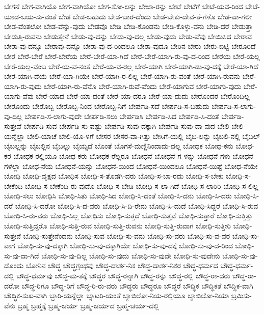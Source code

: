 {ಬೇಗನೆ
ಬೇಗ-ವಾಗಿಯೊ
ಬೇಗ-ವಾಗಿಯೋ
ಬೇಗ-ಸೋ-ಲನ್ನು
ಬೇಜಾ-ರನ್ನು
ಬೇಟೆ
ಬೇಟೆಗೆ
ಬೇಟೆ-ಯವ-ರಿಂದ
ಬೇಟೆ-ಯಾಡ-ಬಯ-ಸು-ವಂತೆ
ಬೇಡ
ಬೇಡ-ಬಹುದು
ಬೇಡ-ಬಾರ-ದೆಂದು
ಬೇಡ-ಬೇಕು-ದೇವ-ತೆ-ಗಳೊ
ಬೇಡ-ವಾ-ಗಲೀ
ಬೇಡ-ವೆಂತಲೋ
ಬೇಡ-ವೆನ್ನು-ವುದು
ಬೇಡವೊ
ಬೇಡಿ
ಬೇಡಿ-ಕೊಂಡನು
ಬೇಡಿ-ಕೊಳ್ಳು-ವನು
ಬೇಡಿ-ದರೆ
ಬೇಡುತ್ತಾ
ಬೇಡುತ್ತಿ-ರುವನು
ಬೇಡುತ್ತೇನೆ
ಬೇಡು-ವು-ದನ್ನು
ಬೇಡು-ವು-ದಲ್ಲ
ಬೇಡು-ವುದು
ಬೇಡು-ವೆವು
ಬೇಯಿಸಿದ
ಬೇರಾವ
ಬೇರಾ-ವು-ದನ್ನೂ
ಬೇರಾವು-ದನ್ನೊ
ಬೇರಾ-ವು-ದ-ರಿಂದಲೂ
ಬೇರಾ-ವುದೂ
ಬೇರಿನ
ಬೇರು
ಬೇರು-ಬಿಟ್ಟಿ
ಬೇರೂರಿದೆ
ಬೇರೆ
ಬೇರೆ-ಬೇರೆ
ಬೇರೆ-ಬೇರೆಯ
ಬೇರೆ-ಬೇರೆ-ಯಾ-ಗಿದೆ
ಬೇರೆ-ಬೇರೆ-ಯಾಗಿ-ರು-ವು-ದ-ರಿಂದ
ಬೇರೆಯ
ಬೇರೆ-ಯಲ್ಲ
ಬೇರೆ-ಯಲ್ಲ-ವೆಂಬ
ಬೇರೆ-ಯ-ವ-ನಂತೆ
ಬೇರೆ-ಯ-ವ-ರಲ್ಲ
ಬೇರೆ-ಯಾಗಿ
ಬೇರೆ-ಯಾಗಿ-ಡು-ವು-ದಕ್ಕೆ
ಬೇರೆ-ಯಾ-ಗಿದೆ
ಬೇರೆ-ಯಾಗಿ-ದೆಯೆ
ಬೇರೆ-ಯಾ-ಗಿಯೇ
ಬೇರೆ-ಯಾಗಿ-ರ-ಲಿಲ್ಲ
ಬೇರೆ-ಯಾಗಿ-ರು-ವಂತೆ
ಬೇರೆ-ಯಾಗಿ-ರುವನು
ಬೇರೆ-ಯಾಗಿ-ರು-ವುದು
ಬೇರೆ-ಯಾಗಿ-ರು-ವೆನೊ
ಬೇರೆ-ಯಾಗಿ-ರುವೆ-ವೆಂದು
ಬೇರೆ-ಯಾಗುವ
ಬೇರೆ-ಯಾಗು-ವುದು
ಬೇರೆ-ಯಾಗು-ವೆವು
ಬೇರೆ-ಯಾದ
ಬೇರೆ-ಯಾ-ದಂತೆ
ಬೇರೆ-ಯಾ-ದರೂ
ಬೇರೆ-ಯಾ-ದುದು
ಬೇರೊಂದರ
ಬೇರೊಂದಿಲ್ಲ
ಬೇರೊಂದು
ಬೇರೊಬ್ಬ
ಬೇರೊಬ್ಬ-ನಿಂದ
ಬೇರೊಬ್ಬ-ನಿಗೆ
ಬೇರ್ಪಡಿ-ಸದೆ
ಬೇರ್ಪಡಿ-ಸ-ಬಹುದು
ಬೇರ್ಪಡಿ-ಸ-ಲಾಗು-ವು-ದಿಲ್ಲ
ಬೇರ್ಪಡಿ-ಸ-ಲಾಗು-ವುದೇ
ಬೇರ್ಪಡಿ-ಸಲು
ಬೇರ್ಪಡಿಸಿ
ಬೇರ್ಪಡಿ-ಸಿದ
ಬೇರ್ಪಡಿ-ಸಿ-ದಂತೆ
ಬೇರ್ಪಡಿ-ಸುತ್ತೇವೆ
ಬೇರ್ಪಡಿ-ಸುವ
ಬೇರ್ಪಡಿ-ಸು-ವಷ್ಟು
ಬೇರ್ಪಡಿ-ಸುವು-ದಕ್ಕಾಗಿ
ಬೇರ್ಪಡಿ-ಸುವು-ದಾ-ವುದ
ಬೇಲಿ
ಬೇಲಿ-ಯನ್ನೆಲ್ಲಾ
ಬೇಲಿ-ಯಾಚೆ
ಬೇಲಿ-ಯೊ-ಳಗೆ
ಬೇಸರ
ಬೇಸರ-ವಾ-ಗಿತ್ತು
ಬೇಸಿಗೆ-ಯಲ್ಲಿ
ಬೈಬ-ಲನ್ನು
ಬೈಬಲಿ-ನಲ್ಲಿ
ಬೈಬಲ್
ಬೈಬಲ್ಲನ್ನು
ಬೈಬಲ್ಲಿನ
ಬೈಬಲ್ಲು
ಬೈಯ್ಯದೆ
ಬೊಂತೆ
ಬೊಗಸೆ-ಮಣ್ಣಿನಿಂದಾದು-ದಲ್ಲ
ಬೋಧಕ
ಬೋಧ-ಕನು
ಬೋಧ-ಕರ
ಬೋಧಕ-ರಲ್ಲಿಯೂ
ಬೋಧ-ಕರು
ಬೋಧಕ-ರೆಲ್ಲರೂ
ಬೋಧನೆ
ಬೋಧನೆ-ಗ-ಳನ್ನು
ಬೋಧನೆ-ಗಳು
ಬೋಧನೆ-ಗಳೆಲ್ಲಾ
ಬೋಧ-ನೆಯ
ಬೋಧನೆ-ಯನ್ನು
ಬೋಧನೆ-ಯಿಂದ
ಬೋಧನೆ-ಯಿಂದಲೂ
ಬೋಧನೆ-ಯಿಷ್ಟೆ
ಬೋಧ-ನೆಯೇ
ಬೋಧಿ
ಬೋಧಿ-ವೃಕ್ಷದ
ಬೋಧಿಸ
ಬೋಧಿ-ಸ-ತೊಡಗಿ-ದರು
ಬೋಧಿ-ಸ-ಬಾ-ರದು
ಬೋಧಿ-ಸ-ಬೇಕು
ಬೋಧಿ-ಸ-ಬೇಕೆಂದಿ
ಬೋಧಿ-ಸ-ಬೇಕೆಂದಿ-ರು-ವುದೊ
ಬೋಧಿ-ಸ-ಬೇಡಿ
ಬೋಧಿ-ಸ-ಲಾ-ಗಿದೆ
ಬೋಧಿ-ಸ-ಲಾರಿರಿ
ಬೋಧಿ-ಸ-ಲಿಲ್ಲ
ಬೋಧಿ-ಸಲು
ಬೋಧಿಸಿ
ಬೋಧಿ-ಸಿತು
ಬೋಧಿ-ಸಿದ
ಬೋಧಿ-ಸಿ-ದಂತೆ
ಬೋಧಿ-ಸಿ-ದನು
ಬೋಧಿ-ಸಿ-ದರು
ಬೋಧಿ-ಸಿ-ದರೆ
ಬೋಧಿ-ಸಿ-ದರೋ
ಬೋಧಿ-ಸಿ-ದ-ವರು
ಬೋಧಿ-ಸಿ-ದಿ-ರೇನು
ಬೋಧಿ-ಸಿ-ದುದೆ
ಬೋಧಿ-ಸಿದ್ದರೆ
ಬೋಧಿ-ಸಿ-ರುವ
ಬೋಧಿ-ಸಿ-ರು-ವರು
ಬೋಧಿ-ಸಿಲ್ಲ
ಬೋಧಿಸು
ಬೋಧಿ-ಸುತ್ತದೆ
ಬೋಧಿ-ಸುತ್ತವೆ
ಬೋಧಿ-ಸುತ್ತಾರೆ
ಬೋಧಿ-ಸುತ್ತಿತ್ತು
ಬೋಧಿ-ಸುತ್ತಿದ್ದರೊ
ಬೋಧಿ-ಸುತ್ತಿ-ರುವ
ಬೋಧಿ-ಸುತ್ತಿ-ರುವನು
ಬೋಧಿ-ಸುತ್ತಿ-ರುವಾಗ
ಬೋಧಿ-ಸುತ್ತೀರಿ
ಬೋಧಿ-ಸುತ್ತೇನೆ
ಬೋಧಿ-ಸುತ್ತೇನೆಂದನು
ಬೋಧಿ-ಸುವ
ಬೋಧಿ-ಸು-ವನು
ಬೋಧಿ-ಸು-ವರು
ಬೋಧಿ-ಸು-ವ-ವರ
ಬೋಧಿ-ಸು-ವಾಗ
ಬೋಧಿ-ಸು-ವು-ದಕ್ಕಾಗಿ
ಬೋಧಿ-ಸು-ವು-ದಕ್ಕಾಗಿಯೇ
ಬೋಧಿ-ಸು-ವು-ದಕ್ಕೆ
ಬೋಧಿ-ಸು-ವು-ದ-ರಿಂದ
ಬೋಧಿ-ಸು-ವು-ದಾ-ಗಿದೆ
ಬೋಧಿ-ಸು-ವು-ದಿಲ್ಲ
ಬೋಧಿ-ಸು-ವುದು
ಬೋಧಿ-ಸು-ವುದೇ
ಬೋಧಿ-ಸು-ವುದೇನು
ಬೋಧಿ-ಸು-ವು-ದೊಂದು
ಬೋನಿನ
ಬೌದ್ಧ
ಬೌದ್ಧಗ್ರಂಥವು
ಬೌದ್ಧ-ದಾರ್ಶ-ನಿಕ
ಬೌದ್ಧ-ದಾರ್ಶ-ನಿಕರ
ಬೌದ್ಧ-ಧರ್ಮದ
ಬೌದ್ಧ-ಧರ್ಮ-ದಲ್ಲಿ
ಬೌದ್ಧ-ಧರ್ಮವು
ಬೌದ್ಧ-ಮ-ತಕ್ಕೆ
ಬೌದ್ಧರ
ಬೌದ್ಧ-ರನ್ನಾಗಿ
ಬೌದ್ಧ-ರನ್ನು
ಬೌದ್ಧ-ರಲ್ಲಿ
ಬೌದ್ಧ-ರಾ-ದರು
ಬೌದ್ಧ-ರಾ-ದರೋ
ಬೌದ್ಧ-ರಿಗೂ
ಬೌದ್ಧ-ರಿಗೆ
ಬೌದ್ಧ-ರಿ-ರು-ವರು
ಬೌದ್ಧರು
ಬೌದ್ಧರೂ
ಬೌದ್ಧರೆ
ಬೌದ್ಧಿಕ
ಬೌದ್ಧಿಕತೆ
ಬೌದ್ಧಿಕ-ವಾಗಿ
ಬೌದ್ಧಿಕ-ಸುಖ-ವಾಗಿ
ಬ್ದಾರಿ-ಯನ್ನೆಲ್ಲಾ
ಬ್ಯಾಟರಿ-ಯಂತೆ
ಬ್ಯಾಬಿಲೋ-ನಿಯ-ರಲ್ಲಿಯೂ
ಬ್ಯಾಬಿಲೋ-ನಿಯಾ
ಬ್ರಮಿಸು-ವೆನು
ಬ್ರಹ್ಮ
ಬ್ರಹ್ಮಕ್ಕೆ
ಬ್ರಹ್ಮ-ಚರ್ಯ
ಬ್ರಹ್ಮ-ಚರ್ಯದ
ಬ್ರಹ್ಮ-ಚರ್ಯ-ದಲ್ಲಿ
}
